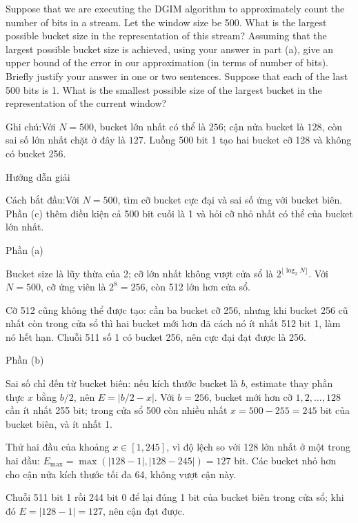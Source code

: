 \documentclass[10pt,a4paper,twocolumn]{article}
\makeatletter
\newcommand{\maptag}[1]{\phantomsection\@bsphack\protected@write\@auxout{}{\string\newlabel{#1}{{}{\thepage}{}{\@currentHref}{}}}\@esphack}
\newcommand{\key}[1]{#1:\enspace}
\newcommand{\solutionprompt}[1]{\par\addvspace{1pt}\noindent\key{Cách bắt đầu}#1\par\addvspace{2pt}}
\newcommand{\examnote}[1]{\par\addvspace{2pt}\noindent\key{Ghi chú}#1\par\addvspace{3pt}}
\newcommand{\blocklabel}[1]{\par\noindent#1\par\nobreak}
\newcommand{\answer}[1]{%
  \par\addvspace{3pt}%
  \blocklabel{#1Hướng dẫn giải}}
\newcommand{\guidepart}[1]{%
  \par\addvspace{1.5pt}%
  \blocklabel{Phần #1}}
\makeatother
\begin{document}
Suppose that we are executing the DGIM algorithm to approximately count the number of bits in a stream. Let the window size be 500.
 What is the largest possible bucket size in the representation of this stream?
 Assuming that the largest possible bucket size is achieved, using your answer in part (a), give an upper bound of the error in our approximation (in terms of number of bits). Briefly justify your answer in one or two sentences.
 Suppose that each of the last 500 bits is 1. What is the smallest possible size of the largest bucket in the representation of the current window?

\examnote{Với $N=500$, bucket lớn nhất có thể là $256$; cận nửa bucket là $128$, còn sai số lớn nhất chặt ở đây là $127$. Luồng 500 bit 1 tạo hai bucket cỡ 128 và không có bucket 256.}
\answer{\maptag{answer:A2-Q3}\maptag{answer:P24-Q6}}
\solutionprompt{Với $N=500$, tìm cỡ bucket cực đại và sai số ứng với bucket biên. Phần (c) thêm điều kiện cả 500 bit cuối là 1 và hỏi cỡ nhỏ nhất có thể của bucket lớn nhất.}
\guidepart{(a)}
\begin{guidesteps}
\item Bucket size là lũy thừa của 2; cỡ lớn nhất không vượt cửa sổ là $2^{\lfloor\log_2N\rfloor}$. Với $N=500$, cỡ ứng viên là $2^8=256$, còn 512 lớn hơn cửa sổ.
\item Cỡ 512 cũng không thể được tạo: cần ba bucket cỡ 256, nhưng khi bucket 256 cũ nhất còn trong cửa sổ thì hai bucket mới hơn đã cách nó ít nhất 512 bit 1, làm nó hết hạn. Chuỗi 511 số 1 có bucket 256, nên cực đại đạt được là 256.
\end{guidesteps}
\guidepart{(b)}
\begin{guidesteps}
\item Sai số chỉ đến từ bucket biên: nếu kích thước bucket là $b$, estimate thay phần thực $x$ bằng $b/2$, nên $E=|b/2-x|$. Với $b=256$, bucket mới hơn cỡ $1,2,\ldots,128$ cần ít nhất 255 bit; trong cửa sổ 500 còn nhiều nhất $x=500-255=245$ bit của bucket biên, và ít nhất 1.
\item Thử hai đầu của khoảng $x\in[1,245]$, vì độ lệch so với 128 lớn nhất ở một trong hai đầu: $E_{\max}=\max(|128-1|,|128-245|)=127$ bit. Các bucket nhỏ hơn cho cận nửa kích thước tối đa 64, không vượt cận này.
\item Chuỗi 511 bit 1 rồi 244 bit 0 để lại đúng 1 bit của bucket biên trong cửa sổ; khi đó $E=|128-1|=127$, nên cận đạt được.
\end{guidesteps}
\end{document}
